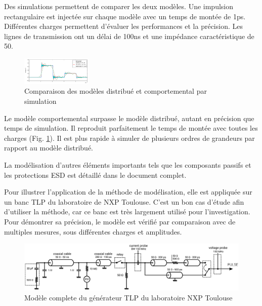 Des simulations permettent de comparer les deux modèles.
Une impulsion rectangulaire est injectée sur chaque modèle avec un temps de montée de 1ps.
Différentes charges permettent d'évaluer les performances et la précision.
Les lignes de transmission ont un délai de 100ns et une impédance caractéristique de 50\textOmega{}.

\begin{figure}[!h]
  \centering
  \includegraphics[width=0.3\textwidth]{src/1/figures/tline_comparison.png}
  \caption{Comparaison des modèles distribué et comportemental par simulation}
  \label{fig:lines-simulations}
\end{figure}

Le modèle comportemental surpasse le modèle distribué, autant en précision que temps de simulation.
Il reproduit parfaitement le temps de montée avec toutes les charges (Fig. \ref{fig:lines-simulations}).
Il est plus rapide à simuler de plusieurs ordres de grandeurs par rapport au modèle distribué.

La modélisation d'autres éléments importants tels que les composants passifs et les protections ESD est détaillé dans le document complet.

Pour illustrer l'application de la méthode de modélisation, elle est appliquée sur un banc TLP du laboratoire de NXP Toulouse.
C'est un bon cas d'étude afin d'utiliser la méthode, car ce banc est très largement utilisé pour l'investigation.
Pour démontrer sa précision, le modèle est vérifié par comparaison avec de multiples mesures, sous différentes charges et amplitudes.

\begin{figure}[!h]
  \centering
  \includegraphics[width=\textwidth]{src/1/figures/complete_nxp_tlp_model.pdf}
  \caption{Modèle complete du générateur TLP du laboratoire NXP Toulouse}
  \label{fig:complete-tlp-model}
\end{figure}

